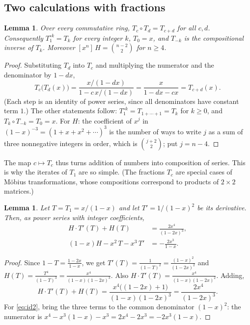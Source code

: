 \documentclass[11pt,a4paper]{article}
\newtheorem{lemma}[theorem]{Lemma}
\theoremstyle{definition}
\theoremstyle{remark}
\newcommand{\coeff}[2]{[x^{#1}]\,#2}
\begin{document}
\subsection{Two calculations with fractions}

\begin{lemma}\label{lem:mobius}
Over every commutative ring, $T_c\circ T_d=T_{c+d}$ for all $c,d$. Consequently $T_1^{\circ k}=T_k$ for every integer
$k$, $T_0=x$, and $T_{-k}$ is the compositional inverse of $T_k$. Moreover $\coeff{n}{H}=\binom{n-2}{2}$ for $n\ge4$.
\end{lemma}

\begin{proof}
Substituting $T_d$ into $T_c$ and multiplying the numerator and the denominator by $1-dx$,
\[
T_c\bigl(T_d(x)\bigr)=\frac{x/(1-dx)}{1-c\,x/(1-dx)}=\frac{x}{1-dx-cx}=T_{c+d}(x).
\]
(Each step is an identity of power series, since all denominators have constant term $1$.) The other statements
follow: $T_1^{\circ k}=T_{1+\cdots+1}=T_k$ for $k\ge0$, and $T_k\circ T_{-k}=T_0=x$. For $H$: the coefficient of $x^j$
in $(1-x)^{-3}=(1+x+x^2+\cdots)^3$ is the number of ways to write $j$ as a sum of three nonnegative integers in order,
which is $\binom{j+2}{2}$; put $j=n-4$.
\end{proof}

The map $c\mapsto T_c$ thus turns addition of numbers into composition of series. This is why the iterates of $T_1$
are so simple. (The fractions $T_c$ are special cases of M\"obius transformations, whose compositions correspond to
products of $2\times2$ matrices.)

\begin{lemma}\label{lem:ident}
Let $T=T_1=x/(1-x)$ and let $T'=1/(1-x)^2$ be its derivative. Then, as power series with integer coefficients,
\begin{align}
H\cdot T'(T)+H(T)&=\frac{2x^4}{(1-2x)^3},\label{eq:id1}\\
(1-x)H-x^2\,T-x^3\,T'&=-\frac{2x^3}{1-x}.\label{eq:id2}
\end{align}
\end{lemma}

\begin{proof}
Since $1-T=\frac{1-2x}{1-x}$, we get $T'(T)=\frac{1}{(1-T)^2}=\frac{(1-x)^2}{(1-2x)^2}$ and
$H(T)=\frac{T^4}{(1-T)^3}=\frac{x^4}{(1-x)(1-2x)^3}$. Also $H\cdot T'(T)=\frac{x^4}{(1-x)(1-2x)^2}$. Adding,
\[
H\cdot T'(T)+H(T)=\frac{x^4\bigl((1-2x)+1\bigr)}{(1-x)(1-2x)^3}=\frac{2x^4}{(1-2x)^3}.
\]
For \eqref{eq:id2}, bring the three terms to the common denominator $(1-x)^2$: the numerator is
$x^4-x^3(1-x)-x^3=2x^4-2x^3=-2x^3(1-x)$.
\end{proof}
\end{document}
